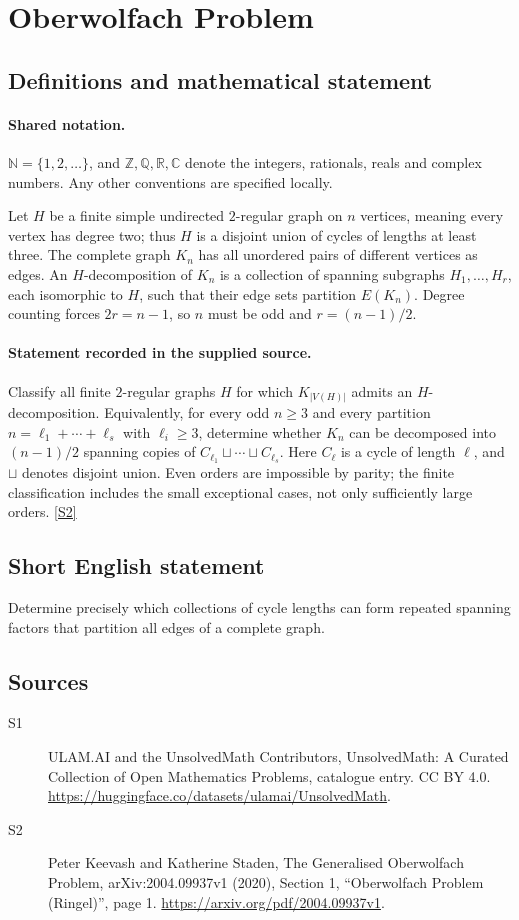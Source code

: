 \documentclass[11pt]{article}
\newcommand{\sref}[2]{\hyperlink{source:#1:#2}{[S#2]}}
\begin{document}
\section{Oberwolfach Problem}\label{statement}

\subsection{Definitions and mathematical statement}

\paragraph{Shared notation.}$\mathbb N=\{1,2,\ldots\}$, and $\mathbb Z,\mathbb Q,\mathbb R,\mathbb C$ denote the integers, rationals, reals and complex numbers. Any other conventions are specified locally.


Let $H$ be a finite simple undirected $2$-regular graph on $n$ vertices, meaning every vertex has degree two; thus $H$ is a disjoint union of cycles of lengths at least three. The complete graph $K_n$ has all unordered pairs of different vertices as edges. An $H$-decomposition of $K_n$ is a collection of spanning subgraphs $H_1,\ldots,H_r$, each isomorphic to $H$, such that their edge sets partition $E(K_n)$. Degree counting forces $2r=n-1$, so $n$ must be odd and $r=(n-1)/2$.
\paragraph{Statement recorded in the supplied source.}
Classify all finite $2$-regular graphs $H$ for which $K_{|V(H)|}$ admits an $H$-decomposition. Equivalently, for every odd $n\ge3$ and every partition $n=\ell_1+\cdots+\ell_s$ with $\ell_i\ge3$, determine whether $K_n$ can be decomposed into $(n-1)/2$ spanning copies of $C_{\ell_1}\sqcup\cdots\sqcup C_{\ell_s}$. Here $C_\ell$ is a cycle of length $\ell$, and $\sqcup$ denotes disjoint union. Even orders are impossible by parity; the finite classification includes the small exceptional cases, not only sufficiently large orders. \sref{statement}{2}
\subsection{Short English statement}
Determine precisely which collections of cycle lengths can form repeated spanning factors that partition all edges of a complete graph.
\subsection{Sources}
\begin{description}
\item[\hypertarget{source:statement:1}{S1}] ULAM.AI and the UnsolvedMath Contributors, UnsolvedMath: A Curated Collection of Open Mathematics Problems, catalogue entry. CC BY 4.0. \url{https://huggingface.co/datasets/ulamai/UnsolvedMath}.
\item[\hypertarget{source:statement:2}{S2}] Peter Keevash and Katherine Staden, The Generalised Oberwolfach Problem, arXiv:2004.09937v1 (2020), Section 1, “Oberwolfach Problem (Ringel)”, page 1. \url{https://arxiv.org/pdf/2004.09937v1}.
\end{description}
\label{end:statement}
\end{document}
